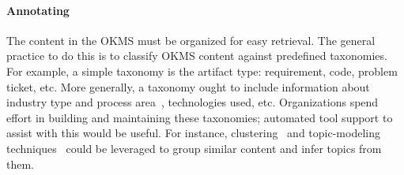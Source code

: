 
\vskip -5pt
\paragraph*{Annotating}
The content in the OKMS must be organized for easy retrieval. The general
practice to do this is to classify OKMS content against predefined
taxonomies. For example, a simple taxonomy is the artifact type: requirement,
code, problem ticket, etc. More generally, a taxonomy ought to include
information about industry type and process area~\cite{apqc,bph}, technologies
used, etc. Organizations spend effort in building and maintaining these
taxonomies; automated tool support to assist with this would be useful. For
instance, clustering~\cite{Berkhin06} and topic-modeling
techniques~\cite{Blei:2012} could be leveraged to group similar content and
infer topics from them.

